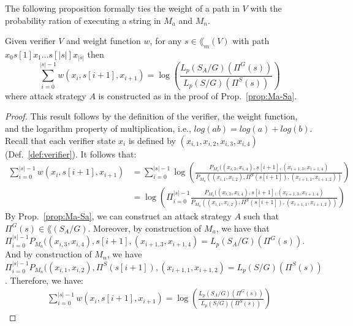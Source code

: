 The following proposition formally ties the weight of a path in $V$ with the probability ration of executing a string in $M_a$ and $M_n$.
\begin{proposition}\label{prop:weight-Ma}
Given verifier $V$ and weight function $w$, for any $s\in \lang_m(V)$ with path $x_0s[1]x_1\dots s[|s|]x_{|s|}$ then
$$\sum_{i=0}^{|s|-1} w(x_i,s[i+1],x_{i+1}) = \log \left(\frac{L_p(S_A/G)(\Pi^G(s))}{L_p(S/G)(\Pi^S(s))} \right)$$
where attack strategy $A$ is constructed as in the proof of Prop.~\ref{prop:Ma-Sa}.
\end{proposition}
\begin{proof}
This result follows by the definition of the verifier, the weight function, and the logarithm property of multiplication, i.e., $log(ab) = log(a) +log(b)$.
Recall that each verifier state $x_i$ is defined by $(x_{i,1},x_{i,2},x_{i,3},x_{i,4})$ (Def.~\ref{def:verifier}).
It follows that:
\begin{align*}
\sum_{i=0}^{|s|-1}w(x_i,s[i+1],x_{i+1}) &= \sum_{i=0}^{|s|-1} \log\left(\frac{P_{M_a}((x_{i,3},x_{i,4}),s[i+1],(x_{i+1,3},x_{i+1,4})}{P_{M_n}((x_{i,1},x_{i,2}),\Pi^S(s[i+1]),(x_{i+1,1},x_{i+1,2}))}\right)\\
&= \log\left(\Pi_{i=0}^{|s|-1} \frac{P_{M_a}((x_{i,3},x_{i,4}),s[i+1],(x_{i+1,3},x_{i+1,4})}{P_{M_n}((x_{i,1},x_{i,2}),\Pi^S(s[i+1]),(x_{i+1,1},x_{i+1,2}))}\right)
\end{align*}
By Prop.~\ref{prop:Ma-Sa}, we can construct an attack strategy $A$ such that $\Pi^G(s)\in \lang(S_A/G)$.
Moreover, by construction of $M_a$, we have that $\Pi_{i=0}^{|s|-1} P_{M_a}((x_{i,3},x_{i,4}),s[i+1],(x_{i+1,3},x_{i+1,4}) = L_p(S_A/G)(\Pi^G(s))$.
And by construction of $M_n$, we have $\Pi_{i=0}^{|s|-1} P_{M_n}((x_{i,1},x_{i,2}),\Pi^S(s[i+1]),(x_{i+1,1},x_{i+1,2}) = L_p(S/G)(\Pi^S(s))$.
Therefore, we have:
\begin{align*}
\sum_{i=0}^{|s|-1}w(x_i,s[i+1],x_{i+1})  = \log\left(\frac{L_p(S_A/G)(\Pi^G(s))}{L_p(S/G)(\Pi^S(s))}\right)
\end{align*}
\end{proof}

